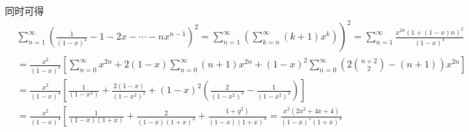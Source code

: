 \begin{solution}
    同时可得
    $$
        \begin{aligned}
             & \left.\sum_{n=1}^{\infty}\left(\frac{1}{(1-x)^2}-1-2 x-\cdots-n x^{n-1}\right)^2=\sum_{n=1}^{\infty}\left(\sum_{k=n}^{\infty}(k+1) x^k\right)\right)^2=\sum_{n=1}^{\infty} \frac{x^{2 n}(1+(1-x) n)^2}{(1-x)^4} \\
             & =\frac{x^2}{(1-x)^4}\left[\sum_{n=0}^{\infty} x^{2 n}+2(1-x) \sum_{n=0}^{\infty}(n+1) x^{2 n}+(1-x)^2 \sum_{n=0}^{\infty}\left(2\binom{n+2}{2}-(n+1)\right) x^{2 n}\right]                                      \\
             & =\frac{x^2}{(1-x)^4}\left[\frac{1}{\left(1-x^2\right)}+\frac{2(1-x)}{\left(1-x^2\right)^2}+(1-x)^2\left(\frac{2}{\left(1-x^2\right)^3}-\frac{1}{\left(1-x^2\right)^2}\right)\right]                             \\
             & =\frac{x^2}{(1-x)^4}\left[\frac{1}{(1-x)(1+x)}+\frac{2}{(1-x)(1+x)^2}+\frac{\left.1+y^2\right)}{(1-x)(1+x)^3}=\frac{x^2\left(2 x^2+4 x+4\right)}{(1-x)^5(1+x)^3}\right.
        \end{aligned}
    $$
\end{solution}



